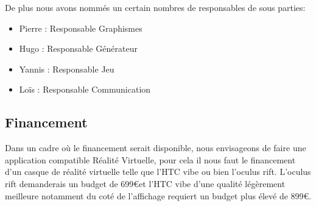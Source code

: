 \documentclass[12pt]{article}
\begin{document}
        \vspace{3mm}
        
        De plus nous avons nommés un certain nombres de responsables de sous parties:
        \begin{itemize}
        \renewcommand{\labelitemi}{$\bullet$}
            \item Pierre : Responsable Graphismes
            \item Hugo : Responsable Générateur
            \item Yannis : Responsable Jeu
            \item Loïs : Responsable Communication
        \end{itemize}
        
    \subsection{Financement}
    
        Dans un cadre où le financement serait disponible, nous envisageons de faire une application compatible Réalité Virtuelle, pour cela il nous faut le financement d'un casque de réalité virtuelle telle que l'HTC vibe ou bien l'oculus rift. L'oculus rift demanderais un budget de 699\euro et l'HTC vibe d'une qualité légèrement meilleure notamment du coté de l'affichage requiert un budget plus élevé de 899\euro.
\end{document}
